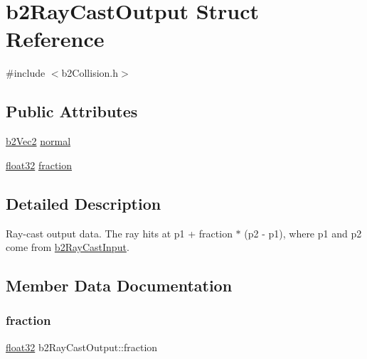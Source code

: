 \hypertarget{structb2_ray_cast_output}{}\section{b2\+Ray\+Cast\+Output Struct Reference}
\label{structb2_ray_cast_output}


{\ttfamily \#include $<$b2\+Collision.\+h$>$}

\subsection*{Public Attributes}
\begin{DoxyCompactItemize}
\item 
\mbox{\hyperlink{structb2_vec2}{b2\+Vec2}} \mbox{\hyperlink{structb2_ray_cast_output_aa9bbfe75afa23c21e85cb1bd3736529b}{normal}}
\item 
\mbox{\hyperlink{b2_settings_8h_aacdc525d6f7bddb3ae95d5c311bd06a1}{float32}} \mbox{\hyperlink{structb2_ray_cast_output_a191c69bb399304bfe30c69e2158b3f29}{fraction}}
\end{DoxyCompactItemize}


\subsection{Detailed Description}
Ray-\/cast output data. The ray hits at p1 + fraction $\ast$ (p2 -\/ p1), where p1 and p2 come from \mbox{\hyperlink{structb2_ray_cast_input}{b2\+Ray\+Cast\+Input}}. 

\subsection{Member Data Documentation}
\mbox{\label{structb2_ray_cast_output_a191c69bb399304bfe30c69e2158b3f29}} 
\subsubsection{\texorpdfstring{fraction}{fraction}}
{\footnotesize\ttfamily \mbox{\hyperlink{b2_settings_8h_aacdc525d6f7bddb3ae95d5c311bd06a1}{float32}} b2\+Ray\+Cast\+Output\+::fraction}

\mbox{\label{structb2_ray_cast_output_aa9bbfe75afa23c21e85cb1bd3736529b}} 
